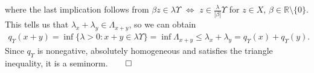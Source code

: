 \documentclass[10pt]{article}
\newcommand{\mbb}[1]{\mathbb{#1}}
\newcommand{\1}[1]{\mathbbm{1}_{#1}}
\begin{document}
    where the last implication follows from $\beta z\in\lambda\Upsilon$ $\Leftrightarrow$ $z\in\tfrac{\lambda}{|\beta|}\Upsilon$ for $z\in X$, $\beta\in\mbb{R}\setminus\{0\}$. This tells us that $\lambda_x+\lambda_y\in\Lambda_{x+y}$, so we can obtain
    \begin{align*}
        q_\Upsilon(x+y)=\inf\{\lambda>0:x+y\in\lambda\Upsilon\}=\inf\Lambda_{x+y}\leq \lambda_x+\lambda_y=q_\Upsilon(x)+q_{\Upsilon}(y).
    \end{align*}
    Since $q_\Upsilon$ is nonegative, absolutely homogeneous and satisfies the triangle inequality, it is a seminorm.\hfill{$\qed$}  
\end{document}
